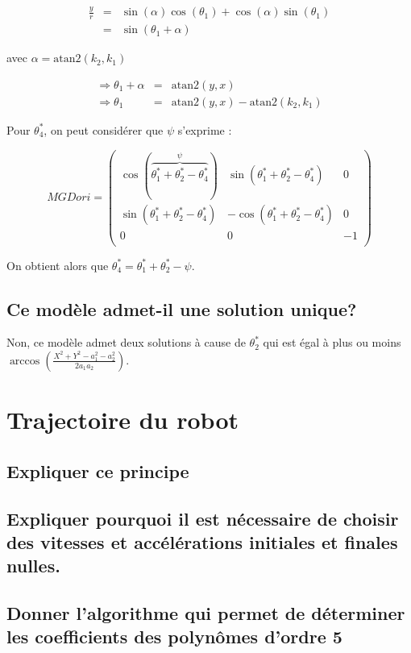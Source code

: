 \documentclass[]{article}
\begin{document}
\[
\begin{array}{lcl} 
  \frac{y}{r} & = & \sin(\alpha)\cos(\theta_1)+\cos(\alpha)\sin(\theta_1)\\
  & = & \sin(\theta_1+\alpha)
\end{array}
\]

avec $\alpha = \mathrm{atan2}(k_2,k_1)$

\[
\begin{array}{lcl} 
  \Rightarrow \theta_1 + \alpha & = & \mathrm{atan2}(y,x)\\
  \Rightarrow \theta_1 & = & \mathrm{atan2}(y,x) - \mathrm{atan2}(k_2,k_1)
\end{array}
\]


Pour $\theta^*_4$, on peut considérer que $\psi$ s'exprime :

\[ 
  MGDori =
  \begin{pmatrix}
    \cos (\overbrace{\theta^*_1+\theta^*_2-\theta^*_4}^{\psi}) & \sin (\theta^*_1+\theta^*_2-\theta^*_4) & 0 \\
    \sin (\theta^*_1+\theta^*_2-\theta^*_4) & -\cos (\theta^*_1+\theta^*_2-\theta^*_4) & 0 \\
    0 & 0 & -1\\
  \end{pmatrix}
\]

On obtient alors que $\theta^*_4 = \theta^*_1+\theta^*_2-\psi$.

\subsection{Ce modèle admet-il une solution unique?}

Non, ce modèle admet deux solutions à cause de $\theta^*_2$ qui est égal à plus ou moins $\arccos(\frac{X^2+Y^2-a_1^2-a_2^2}{2 a_1 a_2})$.

\section{Trajectoire du robot}

\subsection{Expliquer ce principe}



\subsection{Expliquer pourquoi il est nécessaire de choisir des vitesses
et accélérations initiales et finales nulles.}

\subsection{Donner l'algorithme qui permet de déterminer les
coefficients des polynômes d'ordre 5}
\end{document}
